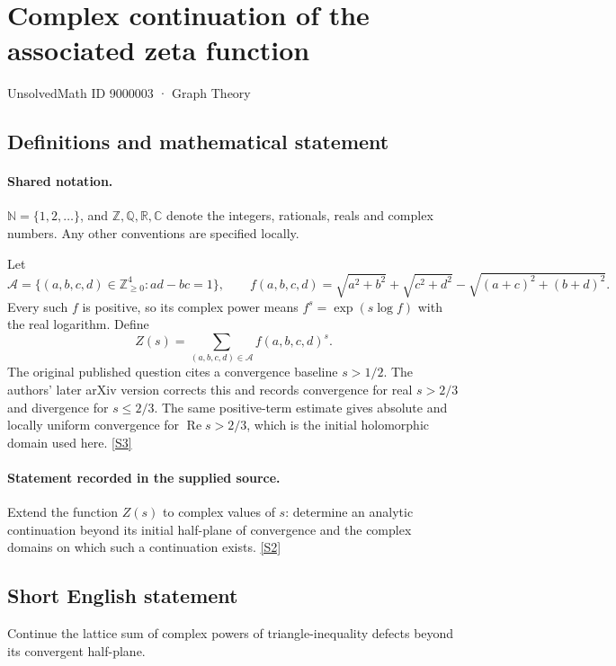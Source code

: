 \documentclass[11pt]{article}
\newcommand{\sref}[2]{\hyperlink{source:#1:#2}{[S#2]}}
\begin{document}
\setcounter{section}{9000002}
\section{Complex continuation of the associated zeta function}\label{9000003}
{\small\sffamily UnsolvedMath ID 9000003 · Graph Theory}
\subsection{Definitions and mathematical statement}

\paragraph{Shared notation.}$\mathbb N=\{1,2,\ldots\}$, and $\mathbb Z,\mathbb Q,\mathbb R,\mathbb C$ denote the integers, rationals, reals and complex numbers. Any other conventions are specified locally.


Let
\[
\mathcal A=\{(a,b,c,d)\in\mathbb Z_{\ge0}^{4}:ad-bc=1\},\qquad
f(a,b,c,d)=\sqrt{a^2+b^2}+\sqrt{c^2+d^2}-\sqrt{(a+c)^2+(b+d)^2}.
\]
Every such $f$ is positive, so its complex power means $f^s=\exp(s\log f)$ with the real logarithm. Define
\[
Z(s)=\sum_{(a,b,c,d)\in\mathcal A} f(a,b,c,d)^s.
\]
The original published question cites a convergence baseline $s>1/2$. The authors' later arXiv version corrects this and records convergence for real $s>2/3$ and divergence for $s\le2/3$. The same positive-term estimate gives absolute and locally uniform convergence for $\operatorname{Re}s>2/3$, which is the initial holomorphic domain used here. \sref{9000003}{3}
\paragraph{Statement recorded in the supplied source.}
Extend the function $Z(s)$ to complex values of $s$: determine an analytic continuation beyond its initial half-plane of convergence and the complex domains on which such a continuation exists. \sref{9000003}{2}
\subsection{Short English statement}
Continue the lattice sum of complex powers of triangle-inequality defects beyond its convergent half-plane.
\end{document}
